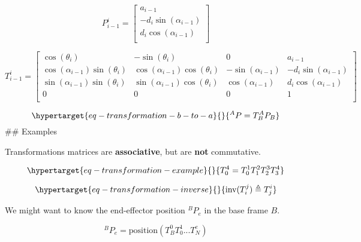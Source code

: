 \documentclass[
  letterpaper,
  DIV=11,
  numbers=noendperiod]{scrreprt}
\begin{document}
\hypertarget{eq-mdh-translation}{}
$$ \begin{equation}
P^i_{i - 1} = \left[
\begin{array}{c}
a_{i - 1} \\
 - d_i \sin\left( \alpha_{i - 1} \right) \\
d_i \cos\left( \alpha_{i - 1} \right) \\
\end{array}
\right]
\end{equation}
 $$

$$ \begin{equation}
T^i_{i - 1} = \left[
\begin{array}{cccc}
\cos\left( \theta_i \right) &  - \sin\left( \theta_i \right) & 0 & a_{i - 1} \\
\cos\left( \alpha_{i - 1} \right) \sin\left( \theta_i \right) & \cos\left( \alpha_{i - 1} \right) \cos\left( \theta_i \right) &  - \sin\left( \alpha_{i - 1} \right) &  - d_i \sin\left( \alpha_{i - 1} \right) \\
\sin\left( \alpha_{i - 1} \right) \sin\left( \theta_i \right) & \sin\left( \alpha_{i - 1} \right) \cos\left( \theta_i \right) & \cos\left( \alpha_{i - 1} \right) & d_i \cos\left( \alpha_{i - 1} \right) \\
0 & 0 & 0 & 1 \\
\end{array}
\right]
\end{equation}
 $$

\begin{equation}\protect\hypertarget{eq-transformation-b-to-a}{}{
{}^AP = T_B^A P_B
}\label{eq-transformation-b-to-a}\end{equation} \#\# Examples

Transformations matrices are \textbf{associative}, but are \textbf{not}
commutative.

\begin{equation}\protect\hypertarget{eq-transformation-example}{}{
T_0^4 = T_0^1 T_1^2 T_2^3 T_3^4 
}\label{eq-transformation-example}\end{equation}

\begin{equation}\protect\hypertarget{eq-transformation-inverse}{}{
\text{inv}(T_i^j) \triangleq T_j^i
}\label{eq-transformation-inverse}\end{equation}

We might want to know the end-effector position \(^BP_e\) in the base
frame \(B\).

\[
^BP_e = \text{position}(T_B^0 T_0^1 ... T_N^e)
\]
\end{document}
